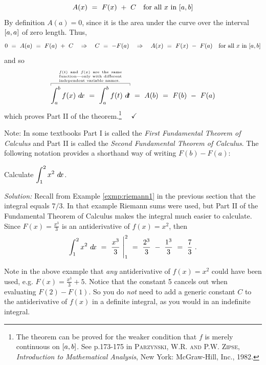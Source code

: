 \[
 A(x) ~=~ F(x) ~+~ C \quad\text{for all $x$ in $\lbrack a,b \rbrack$}
\]
\newpage
By definition $A(a) = 0$, since it is the area under the curve over the
interval $\lbrack a,a \rbrack$ of zero length. Thus,
\[
0 ~=~ A(a) ~=~ F(a) ~+~ C \quad\Rightarrow\quad C ~=~ -F(a)
\quad\Rightarrow\quad A(x) ~=~ F(x) ~-~ F(a)
\quad\text{for all $x$ in $\lbrack a,b \rbrack$}
\]
and so
\[
\overbracket[0.3pt]{
  \int_a^b f(x)~\dx ~=~ \int_a^b f(t)~\dt
}^{\begin{minipage}[t]{0.255\linewidth}
    \tiny
    $f(t)$ and $f(x)$ are the same function---only with different
    independent variable names.
\end{minipage}}
~=~ A(b) ~=~ F(b) ~-~ F(a)
\]
which proves Part II of the theorem.\footnote{The theorem can be proved for the
weaker condition that $f$ is merely continuous on $\lbrack a,b \rbrack$. See p.173-175
in \textsc{Parzynski, W.R. and P.W. Zipse}, \emph{Introduction to Mathematical
Analysis}, New York: McGraw-Hill, Inc., 1982.} $\quad\checkmark$

Note: In some textbooks Part I is called the \emph{First Fundamental Theorem of
Calculus} and Part II is called the \emph{Second Fundamental Theorem of
Calculus}. The following notation provides a shorthand way of writing
$F(b) - F(a)$:


\begin{exmp}\label{exmp:ftc1}
\noindent Calculate $\displaystyle\int_1^2 x^2~d\!x$.\vspace{1mm}
\par\noindent\emph{Solution:} Recall from Example \ref{exmp:riemann1} in the
previous section that the integral equals $7/3$. In that example Riemann sums
were used, but Part II of the Fundamental Theorem of Calculus makes the integral
much easier to calculate. Since $F(x) = \frac{x^3}{3}$ is an antiderivative of
$f(x) = x^2$, then
\[
\int_1^2 x^2~d\!x ~=~ \frac{x^3}{3}~\Biggr|_1^{2} ~=~ \frac{2^3}{3} ~-~ \frac{1^3}{3}
 ~=~ \frac{7}{3} ~.
\]
\end{exmp}
\divider
\vspace{3mm}

Note in the above example that \emph{any} antiderivative of $f(x)=x^2$ could
have been used, e.g. $F(x)= \frac{x^3}{3} + 5$. Notice that the constant 5
cancels out when evaluating $F(2)-F(1)$. So you do \emph{not}
need to add a generic constant $C$ to the antiderivative of $f(x)$ in a
definite integral, as you would in an indefinite integral.

